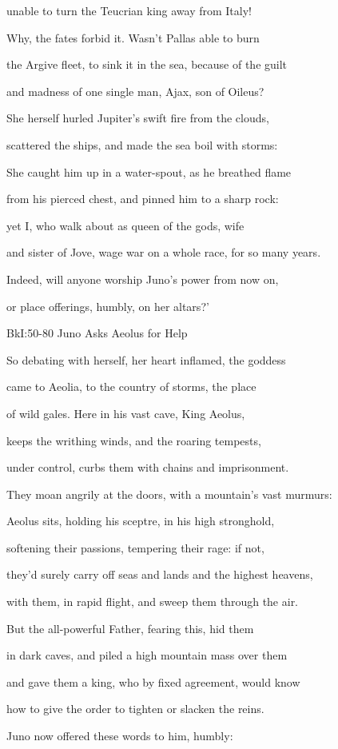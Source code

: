 \documentclass[10pt, a4paper, titlepage]{article}
\begin{document}
unable to turn the Teucrian king away from Italy!

Why, the fates forbid it. Wasn’t Pallas able to burn

the Argive fleet, to sink it in the sea, because of the guilt

and madness of one single man, Ajax, son of Oileus?

She herself hurled Jupiter’s swift fire from the clouds,

scattered the ships, and made the sea boil with storms:

She caught him up in a water-spout, as he breathed flame

from his pierced chest, and pinned him to a sharp rock:

yet I, who walk about as queen of the gods, wife

and sister of Jove, wage war on a whole race, for so many years.

Indeed, will anyone worship Juno’s power from now on,

or place offerings, humbly, on her altars?’


BkI:50-80 Juno Asks Aeolus for Help

So debating with herself, her heart inflamed, the goddess

came to Aeolia, to the country of storms, the place

of wild gales. Here in his vast cave, King Aeolus,

keeps the writhing winds, and the roaring tempests,

under control, curbs them with chains and imprisonment.

They moan angrily at the doors, with a mountain’s vast murmurs:

Aeolus sits, holding his sceptre, in his high stronghold,

softening their passions, tempering their rage: if not,

they’d surely carry off seas and lands and the highest heavens,

with them, in rapid flight, and sweep them through the air.

But the all-powerful Father, fearing this, hid them

in dark caves, and piled a high mountain mass over them

and gave them a king, who by fixed agreement, would know

how to give the order to tighten or slacken the reins.

Juno now offered these words to him, humbly:
\end{document}
